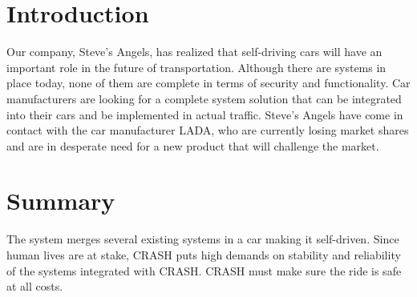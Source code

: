 \documentclass{article}
\begin{document}

\titleformat{\subsubsection}[runin]{\normalsize\bfseries}{}{0pt}{#1\quad\thesubsubsection}


\begingroup
\hypersetup{linkcolor=black}
\tableofcontents
\thispagestyle{empty}
\endgroup
\newpage
\begingroup
\hypersetup{linkcolor=black}
\listoffigures
\thispagestyle{empty}
\endgroup
\newpage
{}

\section{Introduction}
\noindent Our company, Steve's Angels, has realized that self-driving cars will have an important role in the future of transportation. Although there are systems in place today, none of them are complete in terms of security and functionality. Car manufacturers are looking for a complete system solution that can be integrated into their cars and be implemented in actual traffic. Steve's Angels have come in contact with the car manufacturer LADA, who are currently losing market shares and are in desperate need for a new product that will challenge the market. 

\section{Summary}
\noindent The system merges several existing systems in a car making it self-driven. Since human lives are at stake, CRASH puts high demands on stability and reliability of the systems integrated with CRASH. CRASH must make sure the ride is safe at all costs.
\end{document}
